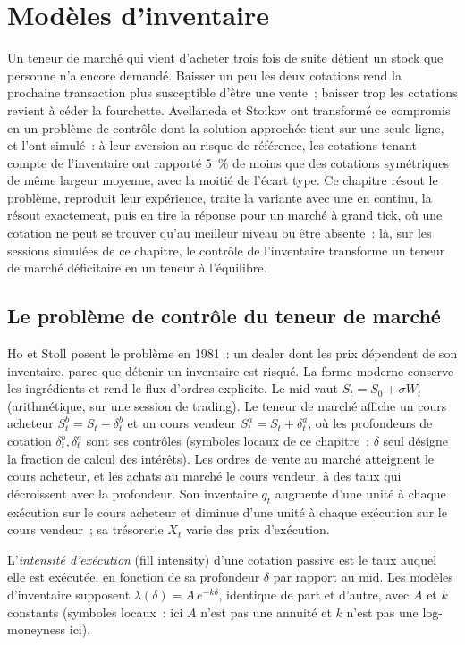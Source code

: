 \chapter{Modèles d'inventaire}\label{ch:hf:inventory-models}

Un teneur de marché qui vient d'acheter trois fois de suite détient un stock que personne n'a encore demandé. Baisser un peu les deux cotations rend la
prochaine transaction plus susceptible d'être une vente~; baisser trop les cotations revient à céder la fourchette. Avellaneda et Stoikov ont transformé ce compromis en un problème de contrôle dont
la solution approchée tient sur une seule ligne, et l'ont simulé~: à leur aversion au risque de référence, les cotations tenant compte de l'inventaire ont rapporté 5~\% de moins que des cotations symétriques
de même largeur moyenne, avec la moitié de l'écart type. Ce chapitre résout le problème, reproduit leur expérience, traite la variante
avec une  en continu, la résout exactement, puis en tire la réponse pour un marché à grand tick, où une cotation ne peut se trouver qu'au meilleur niveau ou être absente~: là,
sur les sessions simulées de ce chapitre, le contrôle de l'inventaire transforme un teneur de marché déficitaire en un teneur à l'équilibre.

\section{Le problème de contrôle du teneur de marché}

Ho et Stoll posent le problème en 1981~: un dealer dont les prix dépendent de son inventaire, parce que détenir un inventaire est risqué. La forme moderne conserve les
ingrédients et rend le flux d'ordres explicite. Le mid vaut $S_t=S_0+\sigma W_t$ (arithmétique, sur une session de trading). Le teneur de marché affiche un cours acheteur
$S^b_t=S_t-\delta^b_t$ et un cours vendeur $S^a_t=S_t+\delta^a_t$, où les profondeurs de cotation $\delta^b_t,\delta^a_t$ sont ses contrôles (symboles locaux de ce
chapitre~; $\delta$ seul désigne la fraction de calcul des intérêts). Les ordres de vente au marché atteignent le cours acheteur, et les achats au marché le cours vendeur, à des taux qui décroissent avec la profondeur.
Son inventaire $q_t$ augmente d'une unité à chaque exécution sur le cours acheteur et diminue d'une unité à chaque exécution sur le cours vendeur~; sa trésorerie $X_t$ varie des prix d'exécution.

\begin{definition}\label{def:hf:inventory-models:intensity}
L'\emph{intensité d'exécution} (fill intensity) d'une cotation passive est le taux auquel elle est exécutée, en fonction de sa profondeur $\delta$ par rapport au
mid. Les modèles d'inventaire supposent $\lambda(\delta)=A\,e^{-k\delta}$, identique de part et d'autre, avec $A$ et $k$ constants (symboles locaux~: ici $A$ n'est pas une
annuité et $k$ n'est pas une log-moneyness ici).
\end{definition}

